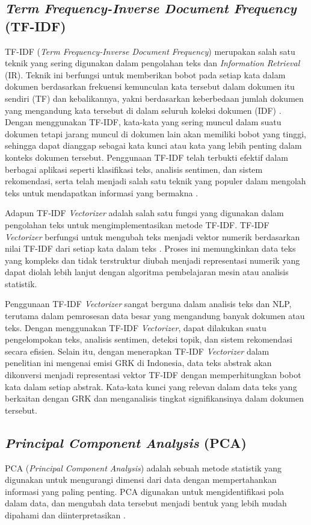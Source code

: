 \subsection{\textit{Term Frequency-Inverse Document Frequency} (TF-IDF)}
TF-IDF (\textit{Term Frequency-Inverse Document Frequency}) merupakan salah satu teknik yang sering digunakan dalam pengolahan teks dan \textit{Information Retrieval} (IR). Teknik ini berfungsi untuk memberikan bobot pada setiap kata dalam dokumen berdasarkan frekuensi kemunculan kata tersebut dalam dokumen itu sendiri (TF) dan kebalikannya, yakni berdasarkan keberbedaan jumlah dokumen yang mengandung kata tersebut di dalam seluruh koleksi dokumen (IDF) \cite{setiawan2022feature}. Dengan menggunakan TF-IDF, kata-kata yang sering muncul dalam suatu dokumen tetapi jarang muncul di dokumen lain akan memiliki bobot yang tinggi, sehingga dapat dianggap sebagai kata kunci atau kata yang lebih penting dalam konteks dokumen tersebut. Penggunaan TF-IDF telah terbukti efektif dalam berbagai aplikasi seperti klasifikasi teks, analisis sentimen, dan sistem rekomendasi, serta telah menjadi salah satu teknik yang populer dalam mengolah teks untuk mendapatkan informasi yang bermakna \cite{sentimanaly2023}.

Adapun TF-IDF \textit{Vectorizer} adalah salah satu fungsi yang digunakan dalam pengolahan teks untuk mengimplementasikan metode TF-IDF. TF-IDF \textit{Vectorizer} berfungsi untuk mengubah teks menjadi vektor numerik berdasarkan nilai TF-IDF dari setiap kata dalam teks \cite{sentimanaly2023}. Proses ini memungkinkan data teks yang kompleks dan tidak terstruktur diubah menjadi representasi numerik yang dapat diolah lebih lanjut dengan algoritma pembelajaran mesin atau analisis statistik.

Penggunaan TF-IDF \textit{Vectorizer} sangat berguna dalam analisis teks dan NLP, terutama dalam pemrosesan data besar yang mengandung banyak dokumen atau teks. Dengan menggunakan TF-IDF \textit{Vectorizer}, dapat dilakukan suatu pengelompokan teks, analisis sentimen, deteksi topik, dan sistem rekomendasi secara efisien. Selain itu, dengan menerapkan TF-IDF \textit{Vectorizer} dalam penelitian ini mengenai emisi GRK di Indonesia, data teks abstrak akan dikonversi menjadi representasi vektor TF-IDF dengan memperhitungkan bobot kata dalam setiap abstrak. Kata-kata kunci yang relevan dalam data teks yang berkaitan dengan GRK dan menganalisis tingkat signifikansinya dalam dokumen tersebut.

\subsection{\textit{Principal Component Analysis} (PCA)}
PCA (\textit{Principal Component Analysis}) adalah sebuah metode statistik yang digunakan untuk mengurangi dimensi dari data dengan mempertahankan informasi yang paling penting. PCA digunakan untuk mengidentifikasi pola dalam data, dan mengubah data tersebut menjadi bentuk yang lebih mudah dipahami dan diinterpretasikan \cite{kurita2019principal}. 

